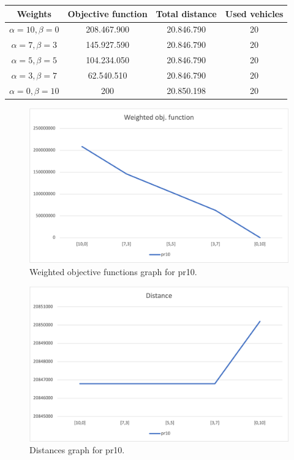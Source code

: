 {
\renewcommand{\arraystretch}{2}
\begin{longtable}[h]{| c | c | c | c |}
    \hline
    \textbf{Weights} & \textbf{Objective function} & \textbf{Total distance} & \textbf{Used vehicles} \\
    \hline
    \endhead
    $\alpha = 10, \beta = 0$ & 208.467.900 & 20.846.790 & 20 \\
    \hline
    $\alpha = 7, \beta = 3$  & 145.927.590 & 20.846.790 & 20 \\
    \hline
    $\alpha = 5, \beta = 5$  & 104.234.050 & 20.846.790 & 20 \\
    \hline
    $\alpha = 3, \beta = 7$  &  62.540.510 & 20.846.790 & 20 \\
    \hline
    $\alpha = 0, \beta = 10$ &         200 & 20.850.198 & 20 \\
    \hline
\end{longtable}
}
\begin{figure}[H]
    \centering
    \includegraphics[width=1.0\columnwidth]{../graphs/pr10-wobjf.png}
    \caption{Weighted objective functions graph for pr10.}
\end{figure}

\begin{figure}[H]
    \centering
    \includegraphics[width=1.0\columnwidth]{../graphs/pr10-distance.png}
    \caption{Distances graph for pr10.}
\end{figure}

